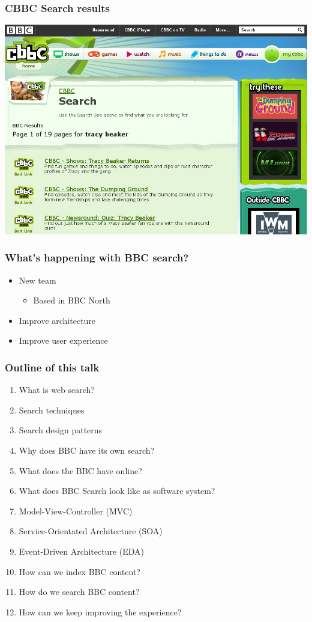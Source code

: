 \documentclass{beamer}
\begin{document}
\begin{frame}
  \frametitle{CBBC Search results}
  \includegraphics[width=\linewidth]{cbbc.png}
\end{frame}

\begin{frame}
  \frametitle{What's happening with BBC search?}
  \begin{itemize}
    \pause \item New team
    \begin{itemize}
    \pause \item Based in BBC North
    \end{itemize}
    \pause \item Improve architecture
    \pause \item Improve user experience
  \end{itemize}
\end{frame}

\begin{frame}
  \frametitle{Outline of this talk}
  \begin{enumerate}
    \pause \item What is web search?
    \pause \item Search techniques
    \pause \item Search design patterns
    \pause \item Why does BBC have its own search?
    \pause \item What does the BBC have online?
    \pause \item What does BBC Search look like as software system?
    \pause \item Model-View-Controller (MVC)
    \pause \item Service-Orientated Architecture (SOA)
    \pause \item Event-Driven Architecture (EDA)
    \pause \item How can we index BBC content?
    \pause \item How do we search BBC content?
    \pause \item How can we keep improving the experience?
  \end{enumerate}
\end{frame}
\end{document}
